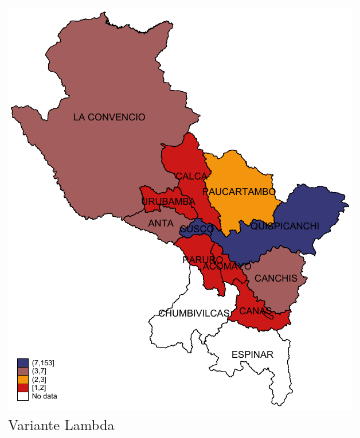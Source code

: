 \documentclass[12pt,a4paper,openany]{book}
\begin{document}
			\begin{figure}[h]
				\caption{Distribución provincial de las variantes de SARS-Cov-2 aisladas en la Región Cusco, hasta la SE43.}
				\label{fig:mapa_variantes}
				\centering
				\begin{subfigure}[b]{0.40\textwidth}
					\centering
					\includegraphics[width=\textwidth]{../figuras/variantes_provincial_lambda.pdf}
					\caption{Variante Lambda}
				\end{subfigure}
				\hfill
				\begin{subfigure}[b]{0.40\textwidth}
					\centering

\end{subfigure}
\end{figure}
\end{document}

